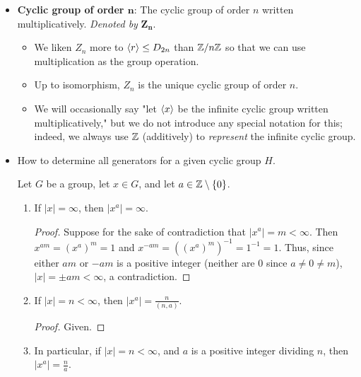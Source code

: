 \documentclass[../notes.tex]{subfiles}
\begin{document}
\begin{itemize}
\begin{theorem}
\begin{enumerate}
\begin{proof}
                By Proposition \ref{prp:2.2}, $a\neq b$ implies $x^a\neq x^b$ for all distinct $a,b\in\Z$. Thus, $\varphi$ is injective. By the definition of a cyclic group, $\varphi$ is surjective. Thus, it is bijective. Additionally, laws of exponents prove that it is a homomorphism, as above.
            \end{proof}
        \end{enumerate}
    \end{theorem}
    \item \textbf{Cyclic group of order $\bm{n}$}: The cyclic group of order $n$ written multiplicatively. \emph{Denoted by} $\bm{Z_n}$.
    \begin{itemize}
        \item We liken $Z_n$ more to $\left\langle{r}\right\rangle\leq D_{2n}$ than $\mathbb{Z}/n\mathbb{Z}$ so that we can use multiplication as the group operation.
        \item Up to isomorphism, $Z_n$ is the unique cyclic group of order $n$.
        \item We will occasionally say "let $\left\langle{x}\right\rangle$ be the infinite cyclic group written multiplicatively," but we do not introduce any special notation for this; indeed, we always use $\mathbb{Z}$ (additively) to \emph{represent} the infinite cyclic group.
    \end{itemize}
    \item How to determine all generators for a given cyclic group $H$.
    \begin{proposition}\label{prp:2.5}
        Let $G$ be a group, let $x\in G$, and let $a\in\mathbb{Z}\setminus\{0\}$.
        \begin{enumerate}
            \item If $|x|=\infty$, then $|x^a|=\infty$.
            \begin{proof}
                Suppose for the sake of contradiction that $|x^a|=m<\infty$. Then $x^{am}=(x^a)^m=1$ and $x^{-am}=((x^a)^m)^{-1}=1^{-1}=1$. Thus, since either $am$ or $-am$ is a positive integer (neither are 0 since $a\neq 0\neq m$), $|x|=\pm am<\infty$, a contradiction.
            \end{proof}
            \item If $|x|=n<\infty$, then $|x^a|=\frac{n}{(n,a)}$.
            \begin{proof}
                Given.
            \end{proof}
            \item In particular, if $|x|=n<\infty$, and $a$ is a positive integer dividing $n$, then $|x^a|=\frac{n}{a}$.

\end{enumerate}
\end{proposition}
\end{itemize}
\end{document}
